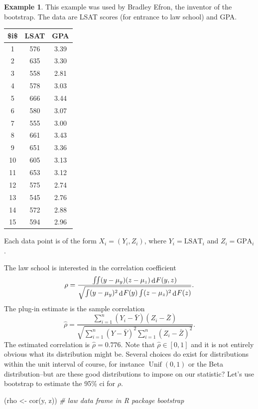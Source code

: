 \documentclass[
]{book}
\newenvironment{Shaded}{\begin{snugshade}}{\end{snugshade}}
\newcommand{\CommentTok}[1]{\textcolor[rgb]{0.56,0.35,0.01}{\textit{#1}}}
\newcommand{\FunctionTok}[1]{\textcolor[rgb]{0.00,0.00,0.00}{#1}}
\newcommand{\NormalTok}[1]{#1}
\newcommand{\OtherTok}[1]{\textcolor[rgb]{0.56,0.35,0.01}{#1}}
\DeclareMathOperator{\Unif}{Unif}
\DeclareMathOperator{\dd}{d}
\newcommand{\dint}{\dd\hspace{0.5pt}\!}
\theoremstyle{definition}
\theoremstyle{definition}
\newtheorem{example}{Example}[chapter]
\theoremstyle{definition}
\theoremstyle{definition}
\theoremstyle{remark}
\begin{document}
\begin{example}

This example was used by Bradley Efron, the inventor of the bootstrap. The data are LSAT scores (for entrance to law school) and GPA.

\begin{tabular}{c|c|c}
\hline
\$i\$ & LSAT & GPA\\
\hline
1 & 576 & 3.39\\
\hline
2 & 635 & 3.30\\
\hline
3 & 558 & 2.81\\
\hline
4 & 578 & 3.03\\
\hline
5 & 666 & 3.44\\
\hline
6 & 580 & 3.07\\
\hline
7 & 555 & 3.00\\
\hline
8 & 661 & 3.43\\
\hline
9 & 651 & 3.36\\
\hline
10 & 605 & 3.13\\
\hline
11 & 653 & 3.12\\
\hline
12 & 575 & 2.74\\
\hline
13 & 545 & 2.76\\
\hline
14 & 572 & 2.88\\
\hline
15 & 594 & 2.96\\
\hline
\end{tabular}

Each data point is of the form \(X_i=(Y_i, Z_i)\), where \(Y_i = \text{LSAT}_i\) and \(Z_i = \text{GPA}_i\).

The law school is interested in the correlation coefficient
\[
\rho = \frac{\iint (y-\mu_y)(z-\mu_z)\dint F(y,z)}{\sqrt{\int(y-\mu_y)^2\dint F(y) \int (z-\mu_z)^2\dint F(z)}}.
\]
The plug-in estimate is the sample correlation
\[
\hat\rho = \frac{\sum_{i=1}^n (Y_i-\bar Y)(Z_i-\bar Z)}{\sqrt {\sum_{i=1}^n (Y - \bar Y)^2\sum_{i=1}^n (Z_i-\bar Z)^2}}.
\]
The estimated correlation is \(\hat\rho=0.776\). Note that \(\hat\rho\in[0,1]\) and it is not entirely obvious what its distribution might be.
Several choices do exist for distributions within the unit interval of course, for instance \(\Unif(0,1)\) or the Beta distribution--but are these good distributions to impose on our statistic?
Let's use bootstrap to estimate the 95\% ci for \(\rho\).

\begin{Shaded}
\begin{Highlighting}[]
\NormalTok{(rho }\OtherTok{\textless{}{-}} \FunctionTok{cor}\NormalTok{(y, z))  }\CommentTok{\# \textquotesingle{}law\textquotesingle{} data frame in R package \textquotesingle{}bootstrap\textquotesingle{}}
\end{Highlighting}
\end{Shaded}


\end{example}
\end{document}
